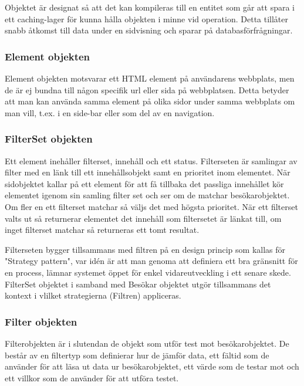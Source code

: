 Objektet är designat så att det kan kompileras till en entitet som går att spara i ett caching-lager för kunna hålla objekten i minne vid operation. Detta tillåter snabb åtkomst till data under en sidvisning och sparar på databasförfrågningar.

\subsubsection{Element objekten}



Element objekten motsvarar ett HTML element på användarens webbplats, men de är ej bundna till någon specifik url eller sida på webbplatsen. Detta betyder att man kan använda samma element på olika sidor under samma webbplats om man vill, t.ex. i en side-bar eller som del av en navigation.

\subsubsection{FilterSet objekten}



Ett element inehåller filterset, innehåll och ett status. Filterseten är samlingar av filter med en länk till ett innehållsobjekt samt en prioritet inom elementet. När sidobjektet kallar på ett element för att få tillbaka det passliga innehållet kör elementet igenom sin samling filter set och ser om de matchar besökarobjektet. Om fler en ett filterset matchar så väljs det med högsta prioritet. När ett filterset valts ut så returnerar elementet det innehåll som filtersetet är länkat till, om inget filterset matchar så returneras ett tomt resultat.

Filterseten bygger tillsammans med filtren på en design princip som kallas för "Strategy pattern", var idén är att man genoma att definiera ett bra gränsnitt för en process, lämnar systemet öppet för enkel vidareutveckling i ett senare skede. FilterSet objektet i samband med Besökar objektet utgör tillsammans det kontext i vlilket strategierna (Filtren) appliceras.

\subsubsection{Filter objekten}



Filterobjekten är i slutendan de objekt som utför test mot besökarobjektet. De består av en filtertyp som definierar hur de jämför data, ett fältid som de använder för att läsa ut data ur besökarobjektet, ett värde som de testar mot och ett villkor som de använder för att utföra testet.

